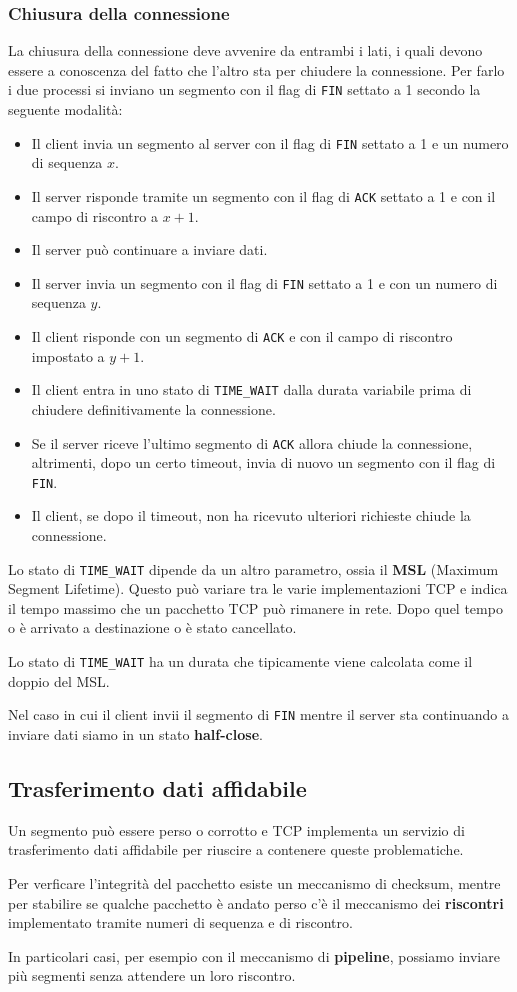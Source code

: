 \subsubsection{Chiusura della connessione}
La chiusura della connessione deve avvenire da entrambi i lati, i quali devono essere a conoscenza
del fatto che l'altro sta per chiudere la connessione. Per farlo i due processi si inviano un
segmento con il flag di \verb|FIN| settato a 1 secondo la seguente modalità:
\begin{itemize}
	\item Il client invia un segmento al server con il flag di \verb|FIN| settato a 1 e un numero
	      di sequenza $x$.
	\item Il server risponde tramite un segmento con il flag di \verb|ACK| settato a 1 e con il
	      campo di riscontro a $x+1$.
	\item Il server può continuare a inviare dati.
	\item Il server invia un segmento con il flag di \verb|FIN| settato a 1 e con un numero di
	      sequenza $y$.
	\item Il client risponde con un segmento di \verb|ACK| e con il campo di riscontro impostato
	      a $y+1$.
	\item Il client entra in uno stato di \verb|TIME_WAIT| dalla durata variabile prima di
	      chiudere definitivamente la connessione.
	\item Se il server riceve l'ultimo segmento di \verb|ACK| allora chiude la connessione,
	      altrimenti, dopo un certo timeout, invia di nuovo un segmento con il flag di \verb|FIN|.
	\item Il client, se dopo il timeout, non ha ricevuto ulteriori richieste chiude la
	      connessione.
\end{itemize}
Lo stato di \verb|TIME_WAIT| dipende da un altro parametro, ossia il \textbf{MSL} (Maximum Segment
Lifetime). Questo può variare tra le varie implementazioni TCP e indica il tempo massimo che un
pacchetto TCP può rimanere in rete. Dopo quel tempo o è arrivato a destinazione o è stato
cancellato.

Lo stato di \verb|TIME_WAIT| ha un durata che tipicamente viene calcolata come il doppio del MSL.

Nel caso in cui il client invii il segmento di \verb|FIN| mentre il server sta continuando a
inviare dati siamo in un stato \textbf{half-close}.

\subsection{Trasferimento dati affidabile}
Un segmento può essere perso o corrotto e TCP implementa un servizio di trasferimento dati
affidabile per riuscire a contenere queste problematiche.

Per verficare l'integrità del pacchetto esiste un meccanismo di checksum, mentre per stabilire se
qualche pacchetto è andato perso c'è il meccanismo dei \textbf{riscontri} implementato tramite
numeri di sequenza e di riscontro.

In particolari casi, per esempio con il meccanismo di \textbf{pipeline}, possiamo inviare più
segmenti senza attendere un loro riscontro.
